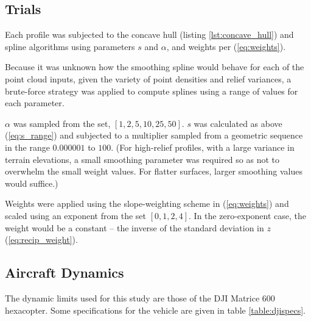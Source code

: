 \documentclass[doc]{apa6}
\begin{document}
\subsection{Trials}

Each profile was subjected to the concave hull (listing \ref{lst:concave_hull}) and spline algorithms using parameters $s$ and $\alpha$, and weights per (\ref{eq:weights}).

Because it was unknown how the smoothing spline would behave for each of the point cloud inputs, given the variety of point densities and relief variances, a brute-force strategy was applied to compute splines using a range of values for each parameter.

$\alpha$ was sampled from the set, $[1, 2, 5, 10, 25, 50]$. $s$ was calculated as above (\ref{eq:s_range}) and subjected to a multiplier sampled from a geometric sequence in the range $0.000001$ to $100$. (For high-relief profiles, with a large variance in terrain elevations, a small smoothing parameter was required so as not to overwhelm the small weight values. For flatter surfaces, larger smoothing values would suffice.)

Weights were applied using the slope-weighting scheme in (\ref{eq:weights}) and scaled using an exponent from the set $[0, 1, 2, 4]$. In the zero-exponent case, the weight would be a constant -- the inverse of the standard deviation in $z$ (\ref{eq:recip_weight}).

\subsection{Aircraft Dynamics}

The dynamic limits used for this study are those of the DJI Matrice 600 hexacopter. Some specifications for the vehicle are given in table \ref{table:djispecs}.
\end{document}
